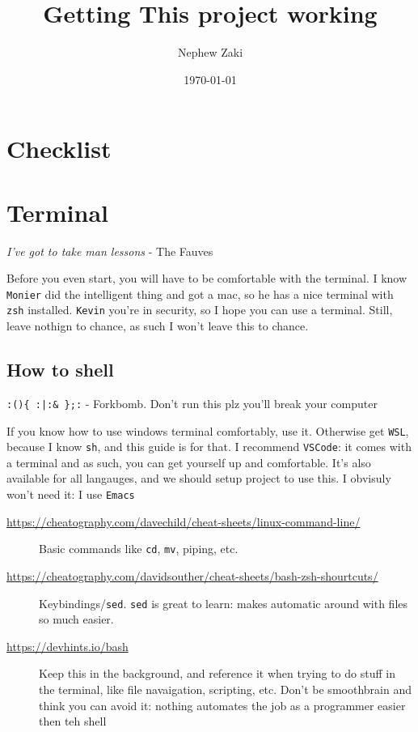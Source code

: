 \documentclass[11pt]{article}
\author{Nephew Zaki}
\date{\today}
\title{Getting This project working}
\begin{document}
\maketitle
\section*{Checklist}
\label{sec:orge65d1fa}
\section*{Terminal}
\label{sec:org5bba858}
\begin{center}
\emph{I've got to take man lessons} - The Fauves
\end{center}
Before you even start, you will have to be comfortable with the terminal. I know \texttt{Monier} did the intelligent thing and got a mac, so he has a nice terminal with \texttt{zsh} installed. \texttt{Kevin} you're in security, so I hope you can use a terminal. Still, leave nothign to chance, as such I won't leave this to chance.

\subsection*{How to shell}
\label{sec:org4661e60}
\begin{center}
\texttt{:()\{ :|:\& \};:}  - Forkbomb. Don't run this plz you'll break your computer
\end{center}
If you know how to use windows terminal comfortably, use it. Otherwise get \texttt{WSL}, because I know \texttt{sh}, and this guide is for that.  I recommend \texttt{VSCode}: it comes with a terminal and as such, you can get yourself up and comfortable. It's also available for all langauges, and we should setup project to use this. I obvisuly won't need it: I use \texttt{Emacs}
\begin{description}
\item[{\url{https://cheatography.com/davechild/cheat-sheets/linux-command-line/}}] Basic commands like \texttt{cd}, \texttt{mv}, piping, etc.
\item[{\url{https://cheatography.com/davidsouther/cheat-sheets/bash-zsh-shourtcuts/}}] Keybindings/​\texttt{sed}. \texttt{sed} is great to learn: makes automatic around with files so much easier.
\item[{\url{https://devhints.io/bash}}] Keep this in the background, and reference it when trying to do stuff in the terminal, like file navaigation, scripting, etc. Don't be smoothbrain and think you can avoid it: nothing automates the job as a programmer easier then teh shell
\end{description}
\end{document}

